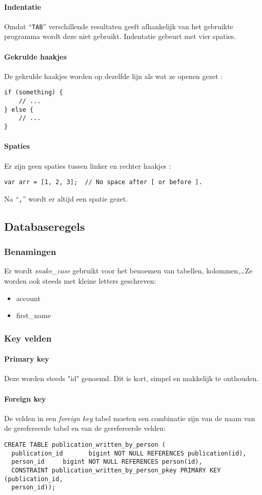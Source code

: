 \paragraph{Indentatie}
Omdat ``\lstinline{TAB}'' verschillende resultaten geeft afhankelijk van het gebruikte programma wordt deze niet gebruikt. Indentatie gebeurt met vier spaties.

\paragraph{Gekrulde haakjes}
De gekrulde haakjes worden op dezelfde lijn als wat ze openen gezet :\\
\begin{lstlisting}
if (something) {
    // ...
} else {
    // ...
}
\end{lstlisting}

\paragraph{Spaties}
Er zijn geen spaties tussen linker en rechter haakjes :\\
\begin{lstlisting}
var arr = [1, 2, 3];  // No space after [ or before ].
\end{lstlisting}

Na ``\lstinline{,}'' wordt er altijd een spatie gezet.

\subsection{Databaseregels}
\subsubsection{Benamingen}
Er wordt \textit{snake\_case} gebruikt voor het benoemen van tabellen, kolommen,\ldots Ze worden ook steeds met kleine letters geschreven:
\begin{itemize}
\item account
\item first\_name
\end{itemize}
\subsubsection{Key velden}
\paragraph{Primary key}
Deze worden steeds "id" genoemd. Dit is kort, simpel en makkelijk te onthouden.
\paragraph{Foreign key}
De velden in een \textit{foreign key} tabel moeten een combinatie zijn van de naam van de gerefereerde tabel en van de gerefereerde velden:
\begin{lstlisting}
CREATE TABLE publication_written_by_person (
  publication_id       bigint NOT NULL REFERENCES publication(id),
  person_id     bigint NOT NULL REFERENCES person(id),
  CONSTRAINT publication_written_by_person_pkey PRIMARY KEY (publication_id,
  person_id));
\end{lstlisting}
